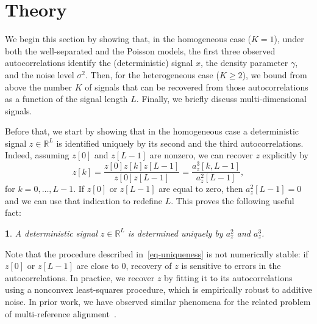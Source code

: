 \documentclass[12pt]{article}
\newcommand{\1}{\mathbf{1}}
\newcommand{\RL}{\mathbb{R}^L}
\theoremstyle{plain}
\theoremstyle{definition}
\theoremstyle{remark}
\theoremstyle{plain}
\theoremstyle{remark}
\theoremstyle{plain}
\theoremstyle{plain}
\theoremstyle{plain}
\newtheorem{proposition}[thm]{\protect\propositionname}
\providecommand{\propositionname}{Proposition}
\numberwithin{equation}{section}
\begin{document}
%

\section{Theory}

We begin this section by showing that, in the homogeneous case ($K=1$), under both the well-separated and the Poisson models, the first three observed autocorrelations  identify the (deterministic) signal $x$, the density parameter $\gamma$, and the noise level $\sigma^2$.  Then, for the heterogeneous case ($K \geq 2$), we bound from above the number $K$ of signals that can be recovered from those autocorrelations as a function of the signal length $L$. Finally, we briefly discuss multi-dimensional signals.

Before that, we start by showing that in the homogeneous case a deterministic signal $z\in\RL$ is identified uniquely by its second and the third autocorrelations.
 Indeed, assuming $z[0]$ and $z[L-1]$ are nonzero, we can recover $z$ explicitly by 
\begin{equation}
%
z[k]  = \frac{z[0]z[k]z[L-1]}{z[0]z[L-1]} = \frac{a_z^3[k,L-1]}{a_z^2[L-1]},
\label{eq-uniqueness}
%
\end{equation}
for $k = 0, \ldots, L-1$. If $z[0]$ or $z[L-1]$ are equal to zero, then $a_z^2[L-1] = 0$ and we can use that indication to redefine $L$.
This proves the following useful fact:
\begin{proposition} \label{prop:uniqueness}
	A deterministic signal $z\in\RL$ is determined uniquely by  $a_z^2$ and $a_z^3$. 
\end{proposition}

Note that the procedure described in~\eqref{eq-uniqueness} is not numerically stable: if $z[0]$ or $z[L-1]$ are close to 0, recovery of $z$ is sensitive to errors in the autocorrelations. In practice, we recover $z$ by fitting it to its autocorrelations using a nonconvex least-squares procedure, which is empirically robust to additive noise. In prior work, we have observed similar phenomena for the related problem of multi-reference alignment~\cite{bendory2017bispectrum,boumal2017heterogeneous,abbe2017multireference}.
\end{document}
